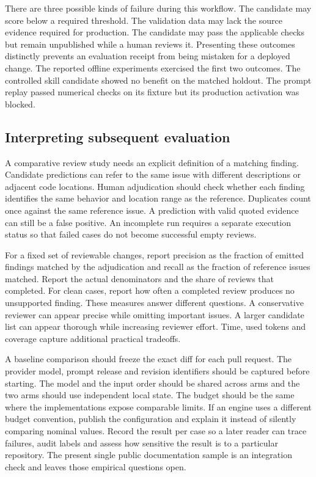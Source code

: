 \documentclass[journal,compsoc]{IEEEtran}
\begin{document}
There are three possible kinds of failure during this workflow. The candidate may score below a required threshold. The validation data may lack the source evidence required for production. The candidate may pass the applicable checks but remain unpublished while a human reviews it. Presenting these outcomes distinctly prevents an evaluation receipt from being mistaken for a deployed change. The reported offline experiments exercised the first two outcomes. The controlled skill candidate showed no benefit on the matched holdout. The prompt replay passed numerical checks on its fixture but its production activation was blocked.

\subsection{Interpreting subsequent evaluation}
A comparative review study needs an explicit definition of a matching finding. Candidate predictions can refer to the same issue with different descriptions or adjacent code locations. Human adjudication should check whether each finding identifies the same behavior and location range as the reference. Duplicates count once against the same reference issue. A prediction with valid quoted evidence can still be a false positive. An incomplete run requires a separate execution status so that failed cases do not become successful empty reviews.

For a fixed set of reviewable changes, report precision as the fraction of emitted findings matched by the adjudication and recall as the fraction of reference issues matched. Report the actual denominators and the share of reviews that completed. For clean cases, report how often a completed review produces no unsupported finding. These measures answer different questions. A conservative reviewer can appear precise while omitting important issues. A larger candidate list can appear thorough while increasing reviewer effort. Time, used tokens and coverage capture additional practical tradeoffs.

A baseline comparison should freeze the exact diff for each pull request. The provider model, prompt release and revision identifiers should be captured before starting. The model and the input order should be shared across arms and the two arms should use independent local state. The budget should be the same where the implementations expose comparable limits. If an engine uses a different budget convention, publish the configuration and explain it instead of silently comparing nominal values. Record the result per case so a later reader can trace failures, audit labels and assess how sensitive the result is to a particular repository. The present single public documentation sample is an integration check and leaves those empirical questions open.
\end{document}
